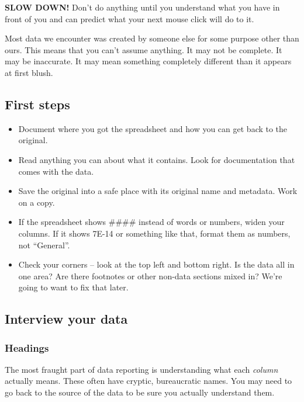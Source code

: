 \documentclass[
  letterpaper,
  DIV=11,
  numbers=noendperiod]{scrreprt}
\providecommand{\tightlist}{%
  \setlength{\itemsep}{0pt}\setlength{\parskip}{0pt}}\usepackage{longtable,booktabs,array}
\begin{document}
\textbf{SLOW DOWN!} Don't do anything until you understand what you have
in front of you and can predict what your next mouse click will do to
it.

Most data we encounter was created by someone else for some purpose
other than ours. This means that you can't assume anything. It may not
be complete. It may be inaccurate. It may mean something completely
different than it appears at first blush.

\hypertarget{first-steps}{%
\subsection{First steps}\label{first-steps}}

\begin{itemize}
\tightlist
\item
  Document where you got the spreadsheet and how you can get back to the
  original.
\item
  Read anything you can about what it contains. Look for documentation
  that comes with the data.
\item
  Save the original into a safe place with its original name and
  metadata. Work on a copy.
\item
  If the spreadsheet shows \#\#\#\# instead of words or numbers, widen
  your columns. If it shows 7E-14 or something like that, format them as
  numbers, not ``General''.
\item
  Check your corners -- look at the top left and bottom right. Is the
  data all in one area? Are there footnotes or other non-data sections
  mixed in? We're going to want to fix that later.
\end{itemize}

\hypertarget{interview-your-data}{%
\subsection{Interview your data}\label{interview-your-data}}

\hypertarget{headings}{%
\subsubsection{Headings}\label{headings}}

The most fraught part of data reporting is understanding what each
\emph{column} actually means. These often have cryptic, bureaucratic
names. You may need to go back to the source of the data to be sure you
actually understand them.
\end{document}
